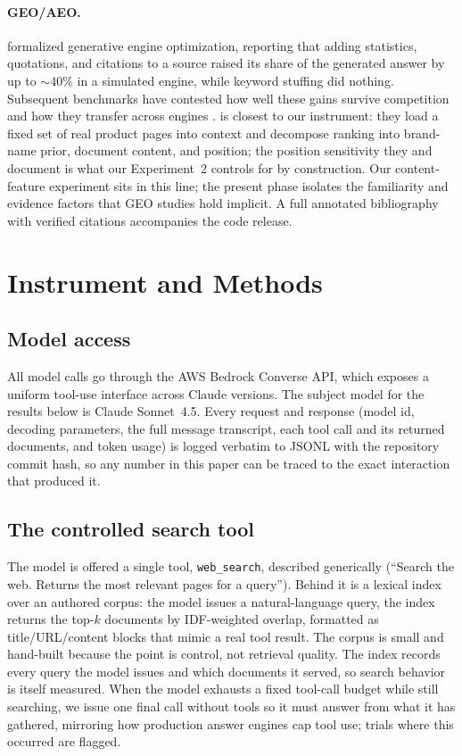 \documentclass[11pt]{article}
\begin{document}
\paragraph{GEO/AEO.}
\citet{aggarwal2024geo} formalized generative engine optimization, reporting that adding
statistics, quotations, and citations to a source raised its share of the generated answer by up to
${\sim}40\%$ in a simulated engine, while keyword stuffing did nothing. Subsequent benchmarks have
contested how well these gains survive competition and how they transfer across engines
\citep{puerto2025cseo}. \citet{pfrommer2024ranking} is closest to our instrument: they load a fixed
set of real product pages into context and decompose ranking into brand-name prior, document
content, and position; the position sensitivity they and \citet{liu2024lost} document is what our
Experiment~2 controls for by construction. Our content-feature experiment sits in this line; the
present phase isolates the familiarity and evidence factors that GEO studies hold implicit. A full
annotated bibliography with verified citations accompanies the code release.

\section{Instrument and Methods}

\subsection{Model access}
All model calls go through the AWS Bedrock Converse API, which exposes a uniform tool-use interface
across Claude versions. The subject model for the results below is Claude Sonnet~4.5. Every request
and response (model id, decoding parameters, the full message transcript, each tool call and its
returned documents, and token usage) is logged verbatim to JSONL with the repository commit hash,
so any number in this paper can be traced to the exact interaction that produced it.

\subsection{The controlled search tool}
The model is offered a single tool, \texttt{web\_search}, described generically (``Search the web.
Returns the most relevant pages for a query''). Behind it is a lexical index over an authored
corpus: the model issues a natural-language query, the index returns the top-$k$ documents by
IDF-weighted overlap, formatted as title/URL/content blocks that mimic a real tool result. The
corpus is small and hand-built because the point is control, not retrieval quality. The index
records every query the model issues and which documents it served, so search behavior is itself
measured. When the model exhausts a fixed tool-call budget while still searching, we issue one
final call without tools so it must answer from what it has gathered, mirroring how production
answer engines cap tool use; trials where this occurred are flagged.
\end{document}
